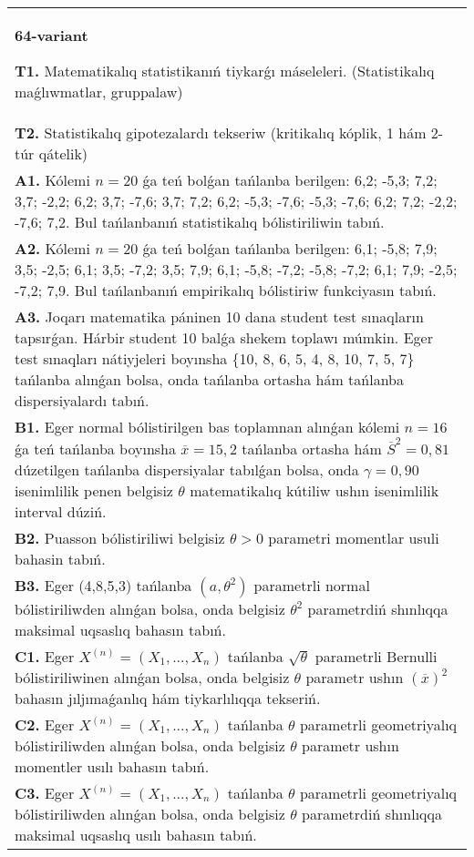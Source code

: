 \documentclass{article}
\begin{document}
\begin{tabular}{m{17cm}}
\textbf{64-variant}
\newline

\textbf{T1.} Matematikalıq statistikanıń tiykarǵı máseleleri. (Statistikalıq maǵlıwmatlar, gruppalaw)
 \\
\textbf{T2.} 
Statistikalıq gipotezalardı tekseriw (kritikalıq kóplik, 1 hám 2-túr qátelik)
 \\
\textbf{A1.} 
Kólemi \(n = 20\) ǵa teń bolǵan tańlanba berilgen: 6,2; -5,3; 7,2; 3,7; -2,2; 6,2; 3,7; -7,6; 3,7; 7,2; 6,2; -5,3; -7,6; -5,3; -7,6; 6,2; 7,2; -2,2; -7,6; 7,2. Bul tańlanbanıń statistikalıq bólistiriliwin tabıń.
 \\
\textbf{A2.} 
Kólemi \(n = 20\) ǵa teń bolǵan tańlanba berilgen: 6,1; -5,8; 7,9; 3,5; -2,5; 6,1; 3,5; -7,2; 3,5; 7,9; 6,1; -5,8; -7,2; -5,8; -7,2; 6,1; 7,9; -2,5; -7,2; 7,9. Bul tańlanbanıń empirikalıq bólistiriw funkciyasın tabıń.
 \\
\textbf{A3.} 
Joqarı matematika páninen 10 dana student test sınaqların tapsırǵan. Hárbir student 10 balǵa shekem toplawı múmkin. Eger test sınaqları nátiyjeleri boyınsha \{10, 8, 6, 5, 4, 8, 10, 7, 5, 7\} tańlanba alınǵan bolsa, onda tańlanba ortasha hám tańlanba dispersiyalardı tabıń.
 \\
\textbf{B1.} 
Eger normal bólistirilgen bas toplamnan alınǵan kólemi \(n = 16\) ǵa teń tańlanba boyınsha \(\overline{x} = 15,2\) tańlanba ortasha hám \({\overline{S}}^{2} = 0,81\) dúzetilgen tańlanba dispersiyalar tabılǵan bolsa, onda \(\gamma = 0,90\) isenimlilik penen belgisiz \(\theta\) matematikalıq kútiliw ushın isenimlilik interval dúziń.
 \\
\textbf{B2.} 
Puasson bólistiriliwi belgisiz \(\theta > 0\) parametri momentlar usuli bahasin tabıń.
 \\
\textbf{B3.} 
Eger (4,8,5,3) tańlanba \(\left( a,\theta^{2} \right)\) parametrli normal bólistiriliwden alınǵan bolsa, onda belgisiz \(\theta^{2}\) parametrdiń shınlıqqa maksimal uqsaslıq bahasın tabıń.
 \\
\textbf{C1.} 
Eger \(X^{(n)} = \left( X_{1},...,X_{n} \right)\) tańlanba \(\sqrt{\theta}\) parametrli Bernulli bólistiriliwinen alınǵan bolsa, onda belgisiz \(\theta\) parametr ushın \((\overline{x})^{2}\) bahasın jıljımaǵanlıq hám tiykarlılıqqa tekseriń.
 \\
\textbf{C2.} 
Eger \(X^{(n)} = \left( X_{1},...,X_{n} \right)\) tańlanba \(\theta\) parametrli geometriyalıq bólistiriliwden alınǵan bolsa, onda belgisiz \(\theta\) parametr ushın momentler usılı bahasın tabıń.
 \\
\textbf{C3.} 
Eger \(X^{(n)} = \left( X_{1},...,X_{n} \right)\) tańlanba \(\theta\) parametrli geometriyalıq bólistiriliwden alınǵan bolsa, onda belgisiz \(\theta\) parametrdiń shınlıqqa maksimal uqsaslıq usılı bahasın tabıń.
 \\

\end{tabular}
\vspace{1cm}
\end{document}
